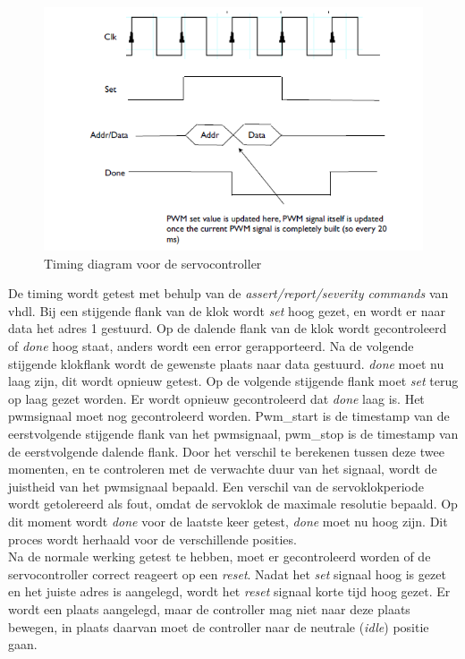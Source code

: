 \begin{figure}[H]
	\centering
	\includegraphics[width=\linewidth]{timing.png}
	\caption{Timing diagram voor de servocontroller}
	\label{fig:timing}
\end{figure}
\noindent
De timing wordt getest met behulp van de \textit{assert/report/severity commands} van \gls{vhdl}. Bij een stijgende flank van de klok wordt \textit{set} hoog gezet, en wordt er naar data het adres 1 gestuurd. Op de dalende flank van de klok wordt gecontroleerd of \textit{done} hoog staat, anders wordt een error gerapporteerd. Na de volgende stijgende klokflank wordt de gewenste plaats naar data gestuurd. \textit{done} moet nu laag zijn, dit wordt opnieuw getest. Op de volgende stijgende flank moet \textit{set} terug op laag gezet worden. Er wordt opnieuw gecontroleerd dat \textit{done} laag is. Het \gls{pwm}signaal moet nog gecontroleerd worden. Pwm\_start is de timestamp van de eerstvolgende stijgende flank van het \gls{pwm}signaal, pwm\_stop is de timestamp van de eerstvolgende dalende flank. Door het verschil te berekenen tussen deze twee momenten, en te controleren met de verwachte duur van het signaal, wordt de juistheid van het \gls{pwm}signaal bepaald. Een verschil van de servoklokperiode wordt getolereerd als fout, omdat de servoklok de maximale resolutie bepaald. Op dit moment wordt \textit{done} voor de laatste keer getest, \textit{done} moet nu hoog zijn. Dit proces wordt herhaald voor de verschillende posities.    \\

Na de normale werking getest te hebben, moet er gecontroleerd worden of de servocontroller correct reageert op een \textit{reset}. Nadat het \textit{set} signaal hoog is gezet en het juiste adres is aangelegd, wordt het \textit{reset} signaal korte tijd hoog gezet. Er wordt een plaats aangelegd, maar de controller mag niet naar deze plaats bewegen, in plaats daarvan moet de controller naar de neutrale (\textit{idle}) positie gaan.

